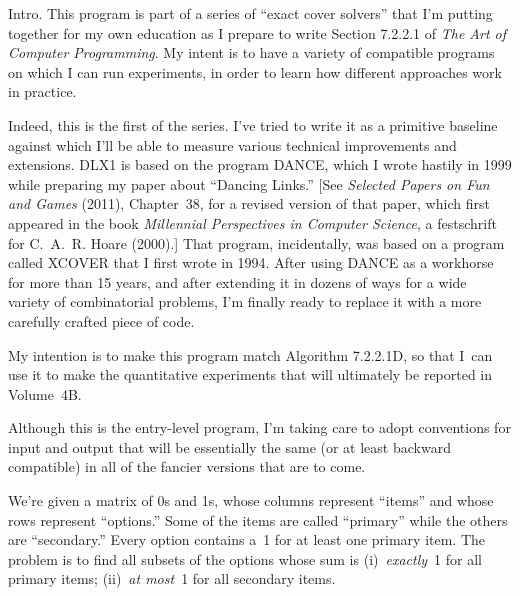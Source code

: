
\let\Xmod=\bmod %

\datethis

Intro. This program is part of a series of ``exact cover solvers'' that
I'm putting together for my own education as I prepare to write Section
7.2.2.1 of {\sl The Art of Computer Programming}. My intent is to
have a variety of compatible programs on which I can run experiments,
in order to learn how different approaches work in practice.

Indeed, this is the first of the series.
I've tried to write it as a primitive baseline against which I'll be able
to measure various technical improvements and extensions.
{\mc DLX1} is based on the program {\mc DANCE}, which I wrote hastily
in 1999 while preparing my paper about ``Dancing Links.'' [See
{\sl Selected Papers on Fun and Games\/} (2011), Chapter~38, for a
revised version of that paper, which first appeared in the book
{\sl Millennial Perspectives in Computer Science\/}, a festschrift
for C.~A.~R. Hoare (2000).] That program, incidentally, was based
on a program called {\mc XCOVER} that I first wrote in 1994.
After using {\mc DANCE} as a workhorse
for more than 15 years, and after extending it in dozens of ways
for a wide variety of combinatorial problems, I'm finally ready to replace it
with a more carefully crafted piece of code.

My intention is to make this program match Algorithm 7.2.2.1D, so that
I~can use it to make the quantitative experiments that will ultimately
be reported in Volume~4B.

Although this is the entry-level program, I'm taking care to adopt conventions
for input and output that will be essentially the same (or at least
backward compatible) in all of the fancier versions that are to come.

We're given a matrix of 0s and 1s, whose columns represent ``items''
and whose rows represent ``options.'' Some of the items are called
``primary'' while the others are ``secondary.''
Every option contains a~1 for at least one primary item.
The problem is to find all subsets of the options whose sum is
(i)~{\it exactly\/}~1 for all primary items;
(ii)~{\it at most\/}~1 for all secondary items.

